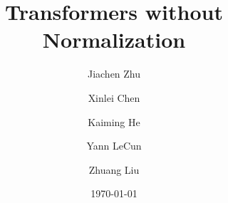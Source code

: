 \documentclass[]{fairmeta}
\title{Transformers without Normalization}
\author[1,2]{Jiachen Zhu}
\author[1]{Xinlei Chen}
\author[3]{Kaiming He}
\author[1,2]{Yann LeCun}
\author[1,4,\dagger]{Zhuang Liu}
\affiliation[1]{FAIR, Meta}
\affiliation[2]{New York University}
\affiliation[3]{MIT}
\affiliation[4]{Princeton University}
\date{\today}
\begin{document}
\maketitle






\beginappendix


\end{document}
